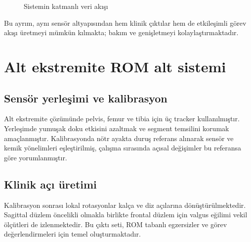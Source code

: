 \documentclass[12pt,a4paper,oneside]{report}
\begin{document}
\begin{figure}[H]
\centering
{}
\caption{Sistemin katmanlı veri akışı}
\label{fig:systemflow}
\end{figure}

Bu ayrım, aynı sensör altyapısından hem klinik çıktılar hem de etkileşimli görev akışı üretmeyi mümkün kılmakta; bakım ve genişletmeyi kolaylaştırmaktadır.

\section{Alt ekstremite ROM alt sistemi}

\subsection{Sensör yerleşimi ve kalibrasyon}
Alt ekstremite çözümünde pelvis, femur ve tibia için üç tracker kullanılmıştır. Yerleşimde yumuşak doku etkisini azaltmak ve segment temsilini korumak amaçlanmıştır. Kalibrasyonda nötr ayakta duruş referans alınarak sensör ve kemik yönelimleri eşleştirilmiş, çalışma sırasında açısal değişimler bu referansa göre yorumlanmıştır.

\subsection{Klinik açı üretimi}
Kalibrasyon sonrası lokal rotasyonlar kalça ve diz açılarına dönüştürülmektedir. Sagittal düzlem öncelikli olmakla birlikte frontal düzlem için valgus eğilimi vekil ölçütleri de izlenmektedir. Bu çıktı seti, ROM tabanlı egzersizler ve görev değerlendirmeleri için temel oluşturmaktadır.
\end{document}
